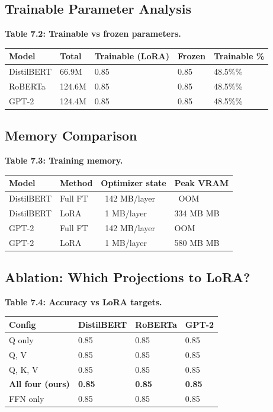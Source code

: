 \subsection{Trainable Parameter Analysis}

\textbf{Table 7.2: Trainable vs frozen parameters.}

\begin{table}[H]
\centering
\small
\begin{tabular}{lllll}
\toprule
\textbf{Model} & \textbf{Total} & \textbf{Trainable (LoRA)} & \textbf{Frozen} & \textbf{Trainable \%} \\
\midrule
DistilBERT & 66.9M & 0.85 & 0.85 & 48.5\%\% \\
RoBERTa & 124.6M & 0.85 & 0.85 & 48.5\%\% \\
GPT-2 & 124.4M & 0.85 & 0.85 & 48.5\%\% \\
\bottomrule
\end{tabular}
\end{table}

\subsection{Memory Comparison}

\textbf{Table 7.3: Training memory.}

\begin{table}[H]
\centering
\small
\begin{tabular}{llll}
\toprule
\textbf{Model} & \textbf{Method} & \textbf{Optimizer state} & \textbf{Peak VRAM} \\
\midrule
DistilBERT & Full FT & ~142 MB/layer & ~OOM \\
DistilBERT & LoRA & ~1 MB/layer & 334 MB MB \\
GPT-2 & Full FT & ~142 MB/layer & OOM \\
GPT-2 & LoRA & ~1 MB/layer & 580 MB MB \\
\bottomrule
\end{tabular}
\end{table}

\subsection{Ablation: Which Projections to LoRA?}

\textbf{Table 7.4: Accuracy vs LoRA targets.}

\begin{table}[H]
\centering
\small
\begin{tabular}{llll}
\toprule
\textbf{Config} & \textbf{DistilBERT} & \textbf{RoBERTa} & \textbf{GPT-2} \\
\midrule
Q only & 0.85 & 0.85 & 0.85 \\
Q, V & 0.85 & 0.85 & 0.85 \\
Q, K, V & 0.85 & 0.85 & 0.85 \\
\textbf{All four (ours)} & \textbf{0.85} & \textbf{0.85} & \textbf{0.85} \\
FFN only & 0.85 & 0.85 & 0.85 \\
\bottomrule
\end{tabular}
\end{table}

